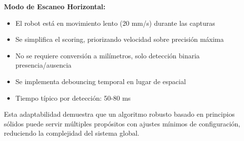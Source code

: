 \textbf{Modo de Escaneo Horizontal:}
\begin{itemize}
\item El robot está en movimiento lento (20 mm/s) durante las capturas
\item Se simplifica el scoring, priorizando velocidad sobre precisión máxima
\item No se requiere conversión a milímetros, solo detección binaria presencia/ausencia
\item Se implementa debouncing temporal en lugar de espacial
\item Tiempo típico por detección: 50-80 ms
\end{itemize}

Esta adaptabilidad demuestra que un algoritmo robusto basado en principios sólidos puede servir múltiples propósitos con ajustes mínimos de configuración, reduciendo la complejidad del sistema global.
